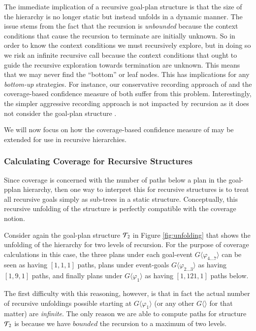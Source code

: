 The immediate implication of a recursive goal-plan structure is that the size of the hierarchy is no longer static but instead unfolds in a dynamic manner. The issue stems from the fact that the recursion is \textit{unbounded} because the context conditions that cause the recursion to terminate are initially unknown. So in order to know the context conditions we must recursively explore, but in doing so we risk an infinite recursive call because the context conditions that ought to guide the recursive exploration towards termination are unknown. This means that we may never find the ``bottom'' or leaf nodes. This has implications for any \textit{bottom-up} strategies. For instance, our conservative recording approach of \cite{Airiau:IJAT:09} and the coverage-based confidence measure of \cite{Singh:AAMAS10} both suffer from this problem. Interestingly, the simpler aggressive recording approach is not impacted by recursion as it does not consider the goal-plan structure . 

We will now focus on how the coverage-based confidence measure of \cite{Singh:AAMAS10} may be extended for use in recursive hierarchies.

\subsubsection{Calculating Coverage for Recursive Structures}

Since coverage is concerned with the number of paths {below} a plan in the goal-pplan hierarchy, then one way to interpret this for recursive structures is to treat all recursive goals simply as sub-trees in a static structure. Conceptually, this recursive unfolding of the structure is perfectly compatible with the coverage notion. 

Consider again the goal-plan structure ${\mathcal{T}}_2$ in Figure \ref{fig:unfolding} that shows the unfolding of the hierarchy for two levels of recursion. For the purpose of coverage calculations in this case, the three plans under each goal-event $G\langle\varphi_{4\ldots7}\rangle$ can be seen as having $[1,1,1]$ paths, plans under event-goals $G\langle\varphi_{2\ldots3}\rangle$ as having $[1,9,1]$ paths, and finally plans under $G\langle\varphi_1\rangle$ as having $[1,121,1]$ paths below.

The first difficulty with this reasoning, however, is that in fact the actual number of recursive unfoldings possible starting at $G\langle\varphi_1\rangle$ (or any other $G\langle\rangle$ for that matter) are \textit{infinite}. The only reason we are able to compute paths for structure ${\mathcal{T}}_2$ is because we have $bounded$ the recursion to a maximum of two levels.

